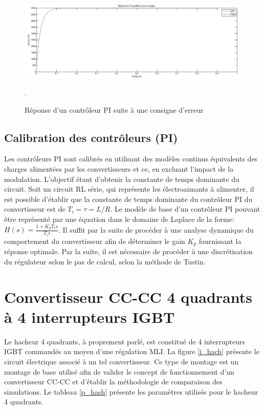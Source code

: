 \begin{figure}[htb]
\centering
\includegraphics[scale=0.5]{fig/Comp/PI.jpg}
\caption{Réponse d'un contrôleur PI suite à une consigne d'erreur}.
\label{PI}
\end{figure}

\clearpage
\subsection{Calibration des contrôleurs (PI)}
Les contrôleurs PI sont calibrés en utilisant des modèles continus équivalents des charges alimentées par les convertisseurs et ce, en excluant l'impact de la modulation. L'objectif étant d'obtenir la constante de temps dominante du circuit. Soit un circuit RL série, qui représente les électroaimants à alimenter, il est possible d'établir que la constante de temps dominante du contrôleur PI du convertisseur est de $T_i = \tau = L/R$. Le modèle de base d'un contrôleur PI pouvant être représenté par une équation dans le domaine de Laplace de la forme: $H(s) = \frac{1 + K_p T_is}{T_i s}$. Il suffit par la suite de procéder à une analyse dynamique du comportement du convertisseur afin de déterminer le gain $K_p$ fournissant la réponse optimale. Par la suite, il est nécessaire de procéder à une discrétisation du régulateur selon le pas de calcul, selon la méthode de Tustin. 
\section{Convertisseur CC-CC 4 quadrants à 4 interrupteurs IGBT}
Le hacheur 4 quadrants, à proprement parlé, est constitué de 4 interrupteurs IGBT commandés au moyen d'une régulation MLI. La figure \ref{i_hach} présente le circuit électrique associé à un tel convertisseur. Ce type de montage est un montage de base utilisé afin de valider le concept de fonctionnement d'un convertisseur CC-CC et d'établir la méthodologie de comparaison des simulations. Le tableau \ref{p_hash} présente les paramètres utilisés pour le hacheur 4 quadrants.

